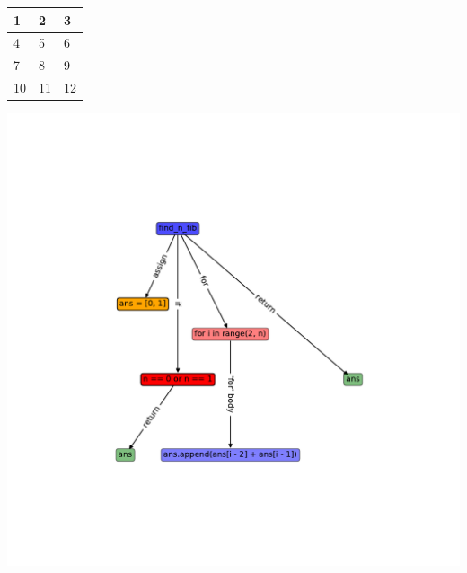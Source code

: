 \documentclass{article}
\begin{document}
\begin{table}[]
 \begin{tabular}{|l|l|l|}
 \hline
 1 & 2 & 3 \\ \hline
 4 & 5 & 6 \\ \hline
 7 & 8 & 9 \\ \hline
 10 & 11 & 12 \\ \hline
 \end{tabular}
 \end{table}
\includegraphics[width=\textwidth]{artifacts/ast.pdf}
\end{document}

